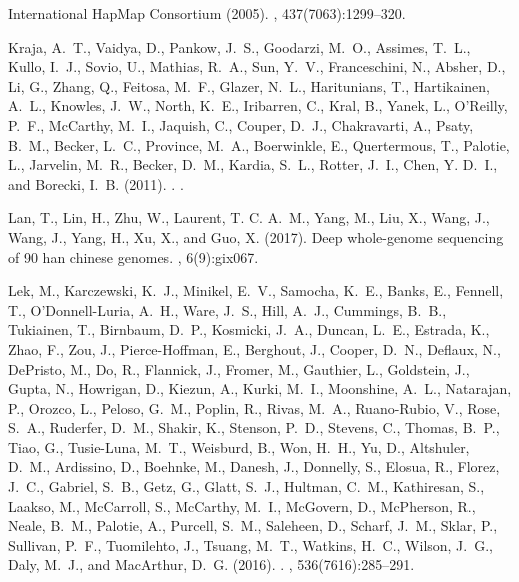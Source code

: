 \documentclass[9pt,article]{template}
\begin{document}
\begin{thebibliography}{}
{International HapMap Consortium} (2005).
, 437(7063):1299--320.

Kraja, A.~T., Vaidya, D., Pankow, J.~S., Goodarzi, M.~O., Assimes, T.~L.,
  Kullo, I.~J., Sovio, U., Mathias, R.~A., Sun, Y.~V., Franceschini, N.,
  Absher, D., Li, G., Zhang, Q., Feitosa, M.~F., Glazer, N.~L., Haritunians,
  T., Hartikainen, A.~L., Knowles, J.~W., North, K.~E., Iribarren, C., Kral,
  B., Yanek, L., O'Reilly, P.~F., McCarthy, M.~I., Jaquish, C., Couper, D.~J.,
  Chakravarti, A., Psaty, B.~M., Becker, L.~C., Province, M.~A., Boerwinkle,
  E., Quertermous, T., Palotie, L., Jarvelin, M.~R., Becker, D.~M., Kardia,
  S.~L., Rotter, J.~I., Chen, Y. D.~I., and Borecki, I.~B. (2011).
.
.

Lan, T., Lin, H., Zhu, W., Laurent, T. C. A.~M., Yang, M., Liu, X., Wang, J.,
  Wang, J., Yang, H., Xu, X., and Guo, X. (2017).
\newblock Deep whole-genome sequencing of 90 han chinese genomes.
, 6(9):gix067.

Lek, M., Karczewski, K.~J., Minikel, E.~V., Samocha, K.~E., Banks, E., Fennell,
  T., O'Donnell-Luria, A.~H., Ware, J.~S., Hill, A.~J., Cummings, B.~B.,
  Tukiainen, T., Birnbaum, D.~P., Kosmicki, J.~A., Duncan, L.~E., Estrada, K.,
  Zhao, F., Zou, J., Pierce-Hoffman, E., Berghout, J., Cooper, D.~N., Deflaux,
  N., DePristo, M., Do, R., Flannick, J., Fromer, M., Gauthier, L., Goldstein,
  J., Gupta, N., Howrigan, D., Kiezun, A., Kurki, M.~I., Moonshine, A.~L.,
  Natarajan, P., Orozco, L., Peloso, G.~M., Poplin, R., Rivas, M.~A.,
  Ruano-Rubio, V., Rose, S.~A., Ruderfer, D.~M., Shakir, K., Stenson, P.~D.,
  Stevens, C., Thomas, B.~P., Tiao, G., Tusie-Luna, M.~T., Weisburd, B., Won,
  H.~H., Yu, D., Altshuler, D.~M., Ardissino, D., Boehnke, M., Danesh, J.,
  Donnelly, S., Elosua, R., Florez, J.~C., Gabriel, S.~B., Getz, G., Glatt,
  S.~J., Hultman, C.~M., Kathiresan, S., Laakso, M., McCarroll, S., McCarthy,
  M.~I., McGovern, D., McPherson, R., Neale, B.~M., Palotie, A., Purcell,
  S.~M., Saleheen, D., Scharf, J.~M., Sklar, P., Sullivan, P.~F., Tuomilehto,
  J., Tsuang, M.~T., Watkins, H.~C., Wilson, J.~G., Daly, M.~J., and MacArthur,
  D.~G. (2016).
.
, 536(7616):285--291.


\end{thebibliography}
\end{document}
